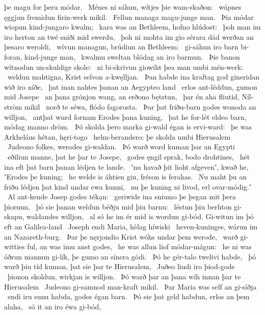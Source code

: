 þe magu for þeru módar. \hld\ Ménes ni sáhun,
wítjes þie wam-skaðon: \hld\ wápnes ęggjun
fremidun firin-werk mikil. \hld\ Fellun managa
magu-junge man. \hld\ Þia módar wiopun
kind-jungaro kwalm; \hld\ kara was an Bethleem,
hofno hlúdost: \hld\ þoh man im iro herton an twé
sniði mid swerdu, \hld\ þoh ni mohta im gio sérara dád
werðan an þesaro weroldi, \hld\ wívun managun,
brúdiun an Bethleem: \hld\ gi-sáhun iro barn bi-foran,
kind-junge man, \hld\ kwalmu sweltan
blódag an iro barmun. \hld\ Þie banon wítnodun
un-skuldige skole: \hld\ ni bi-skrivun giowiht
þea man umbi mén-werk: \hld\ weldun mahtigna,
Krist selvon a-kwęlljan. \hld\ Þan habde ina kraftag god
gineridan wið iro níðe, \hld\ þat inan nahtes þanan
an Aegypteo land \hld\ erlos ant-léddun,
gumon mid Josepe \hld\ an þana grónjon wang,
an erðono bętstun, \hld\ þar én aha fliutid,
Níl-stròm mikil \hld\ norð te séwa,
flódo fagorosta. \hld\ Þar þat friðu-barn godes
wonoda an willjon, \hld\ antþat wurd fornam
Erodes þana kuning, \hld\ þat he for-lét eldeo barn,
módag manno dròm. \hld\ Þó skolda þero marka gi-wald
égan is ervi-ward: \hld\ þe was Arkheláus
hétan, hęri-togo \hld\ helm-berandero:
þe skolda umbi Hierusalem \hld\ Judeono folkes,
werodes gi-waldan. \hld\ Þó warð word kuman
þar an Egypti \hld\ eðiliun manne,
þat he þar te Josepe, \hld\ godes ęngil sprak,
bodo drohtines, \hld\ hét ina eft þat barn þanan
lédjen te lande. \hld\ ʽnu havað þit lioht afgevenʼ, kwað he,
ʽErodes þe kuning; \hld\ he welde is áhtien giu,
fréson is ferahas. \hld\ Nu maht þu an friðu lédjen
þat kind undar ewa kunni, \hld\ nu þe kuning ni livod,
erl ovar-módig.ʼ \hld\ Al ant-kende
Josep godes tékạn: \hld\ geriwide ina sniumo
þe þegan mit þera þiornun, \hld\ þó sie þanan weldun
béðju mid þiu barnu: \hld\ léstun þiu berhton gi-skapu,
waldandes willjon, \hld\ al só he im ér mid is wordun gi-bód.
Gi-witun im þó eft an Galilea-land \hld\ Joseph endi Maria,
hèlag híwiski \hld\ heven-kuninges,
wárun im an Nazareth-burg. \hld\ Þar þe nęrjondio Krist
wóhs undar þem werode, \hld\ warð gi-witties ful,
an was imu anst godes, \hld\ he was allun liof
módar-mágun: \hld\ he ni was óðrun mannun gi-lík,
þe gumo an sínera gódi. \hld\ Þó he gér-talo
twelivi habde, \hld\ þó warð þiu tíd kuman,
þat sie þar te Hierusalem, \hld\ Juðeo liudi
iro þiod-gode \hld\ þionon skoldun,
wirkjan is willjon. \hld\ Þó warð þar an þana wíh innan
þar te Hierusalem \hld\ Judeono gi-samnod
man-kraft mikil. \hld\ Þar Maria was
self an gi-síðja \hld\ endi iru sunu habda,
godes égan barn. \hld\ Þó sie þat geld habdun,
erlos an þem alaha, \hld\ só it an iro éwa gi-bód,
